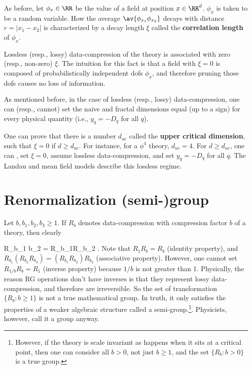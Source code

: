 As before, let
 $\phi_x\in \RR$
be the value of a field
at position $x\in \RR^d$.
 $\phi_x$
is taken to be a random variable.
How the average $\av{\phi_{x_1}\phi_{x_2}}$
decays with distance $r=|x_1-x_2|$
is characterized by a decay length $\xi$
called the \textbf{correlation length}
 of $\phi_x$.



Lossless (resp., lossy) data-compression
of the theory
is associated with zero (resp., non-zero)
$\xi$.
The intuition
for this fact is that a field with
$\xi=0$ is composed of
probabilistically independent dofs $\phi_x$,
and therefore pruning those
dofs causes no loss of information.


As mentioned before, in the
case of lossless (resp., lossy)
data-compression, one can (resp., cannot)
set the naive and fractal dimensions
 equal (up to a sign) for every
physical quantity (i.e.,
$y_q=-D_q$ for all $q$).

One can prove that there is
a number $d_{uc}$ called
the \textbf{upper critical dimension},
such that $\xi=0$
if $d\geq d_{uc}$.
For instance, for a $\phi^4$
theory, $d_{uc}=4$. For $d\geq d_{uc}$,
one can , set $\xi=0$,
assume lossless data-compression,
and
set $y_q=-D_q$ for all $q$.
The Landau and mean field
models describe this lossless regime.



\section{Renormalization (semi-)group}
Let $b, b_1,b_2,b_3\geq 1$.
If $R_b$ denotes
 data-compression
with compression factor $b$
of a  theory, then clearly

\beq
R_{b_1 b_2} = R_{b_1}R_{b_2}
\;.
\eeq
Note that
$R_1 R_b = R_b$
(identity property),
and  $R_{b_1}(R_{b_2}R_{b_3})=
(R_{b_1}R_{b_2})R_{b_3}$
(associative property).
However, one cannot
set $R_{1/b}R_{b}=R_1$ (inverse property)
because $1/b$ is not greater than 1.
Physically,
the reason RG operations
don't have inverses is
that they represent lossy data-compression,
and therefore are irreversible.
So the set of transformation
$\{R_b: b\geq 1\}$
is not a true mathematical
group. In truth, it only
satisfies the properties of
a weaker algebraic
structure called a semi-group.\footnote{However,
if the theory is scale invariant
as happens when it sits at a critical point,
then
one can consider all $b> 0$,
not just $b\geq 1$,
and the set $\{R_b: b>0\}$
is a true group.}.
Physicists, however, call it a group
anyway.







